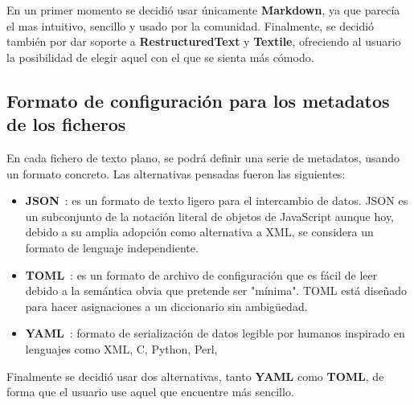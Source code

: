 En un primer momento se decidió usar únicamente \textbf{Markdown}, ya que parecía el mas intuitivo, sencillo y usado por la comunidad. Finalmente,
se decidió también por dar soporte a \textbf{RestructuredText} y \textbf{Textile}, ofreciendo al usuario la posibilidad de elegir aquel
con el que se sienta más cómodo.

\subsection{Formato de configuración para los metadatos de los ficheros}

En cada fichero de texto plano, se podrá definir una serie de metadatos, usando un formato concreto. Las alternativas pensadas fueron
las siguientes:

\begin{itemize}
\item \textbf{JSON}~\cite{json}: es un formato de texto ligero para el intercambio de datos. JSON es un subconjunto de la notación literal de
objetos de JavaScript aunque hoy, debido a su amplia adopción como alternativa a XML, se considera un formato de lenguaje independiente.
\item \textbf{TOML}~\cite{toml}: es un formato de archivo de configuración que es fácil de leer debido a la semántica obvia que pretende ser
"mínima". TOML está diseñado para hacer asignaciones a un diccionario sin ambigüedad.
\item \textbf{YAML}~\cite{yaml}: formato de serialización de datos legible por humanos inspirado en lenguajes como XML, C, Python, Perl,
\end{itemize}


Finalmente se decidió usar dos alternativas, tanto \textbf{YAML} como \textbf{TOML}, de forma que el usuario use aquel que encuentre más
sencillo.
